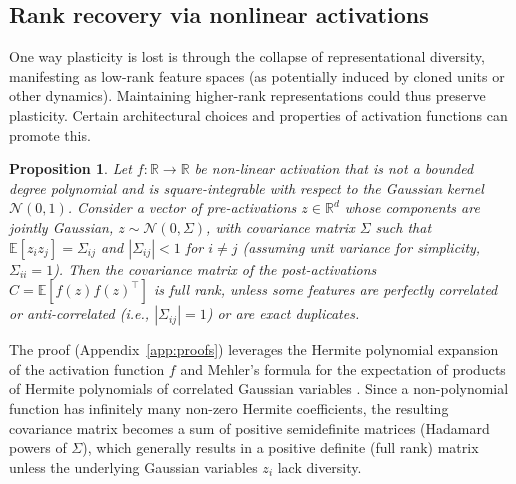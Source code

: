 \documentclass{article}
\newcommand{\R}{\mathbb{R}}
\newcommand{\E}{\mathbb{E}}
\newtheorem{proposition}{Proposition}[section]
\begin{document}
\subsection{Rank recovery via nonlinear activations}

One way plasticity is lost is through the collapse of representational diversity, manifesting as low-rank feature spaces (as potentially induced by cloned units or other dynamics). Maintaining higher-rank representations could thus preserve plasticity. Certain architectural choices and properties of activation functions can promote this.

\begin{proposition}
\label{prop:rank}
Let $f:\R\to\R$ be non-linear activation that is not a bounded degree polynomial and is square-integrable with respect to the Gaussian kernel $\mathcal{N}(0,1)$. Consider a vector of pre-activations $z\in\R^d$ whose components are jointly Gaussian, $z \sim \mathcal{N}(0, \Sigma)$, with covariance matrix $\Sigma$ such that $\E[z_i z_j]=\Sigma_{ij}$ and $|\Sigma_{ij}|<1$ for $i \neq j$ (assuming unit variance for simplicity, $\Sigma_{ii}=1$). Then the covariance matrix of the post-activations $C = \E[f(z)f(z)^\top]$ is full rank, unless some features are perfectly correlated or anti-correlated (i.e., $|\Sigma_{ij}|=1$) or are exact duplicates.
\end{proposition}

The proof (Appendix~\ref{app:proofs}) leverages the Hermite polynomial expansion of the activation function $f$ and Mehler's formula for the expectation of products of Hermite polynomials of correlated Gaussian variables \citep{mehler1866ueber, erdelyi1953higher}. Since a non-polynomial function has infinitely many non-zero Hermite coefficients, the resulting covariance matrix becomes a sum of positive semidefinite matrices (Hadamard powers of $\Sigma$), which generally results in a positive definite (full rank) matrix unless the underlying Gaussian variables $z_i$ lack diversity.

\end{document}
